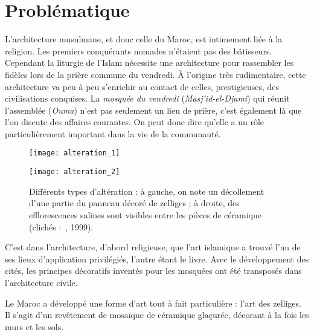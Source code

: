 
\chapter{Problématique}

L'architecture musulmane, et donc celle du Maroc, est intimement 
liée à la religion. Les premiers conquérants nomades n'étaient pas 
des bâtisseurs. Cependant la liturgie de l'Islam nécessite une 
architecture pour rassembler les fidèles lors de la prière commune du 
vendredi. À l'origine très rudimentaire, cette architecture va peu à 
peu s'enrichir au contact de celles, prestigieuses, des civilisations 
conquises. La \emph{mosquée du vendredi} (\emph{Masj'id-el-Djami}) 
qui réunit l'assemblée (\emph{Ouma}) n'est pas seulement un lieu de 
prière, c'est également là que l'on discute des affaires courantes. 
On peut donc dire qu'elle a un rôle particulièrement important dans 
la vie de la communauté.

\begin{figure}[htb]
  \begin{minipage}[t]{0.45\textwidth}
    \vspace{0pt}
    \texttt{[image: alteration\_1]}%
  \end{minipage}%
  \quad%
  \begin{minipage}[t]{0.45\textwidth}
    \vspace{0pt}
    \texttt{[image: alteration\_2]}%
    \caption{Différents types d'altération : à gauche, on note un 
             décollement d'une partie du panneau décoré de zelliges ; 
             à droite, des efflorescences salines sont visibles entre 
             les pièces de céramique (clichés :~, 1999).}
    \label{fig:alteration}
  \end{minipage}%
\end{figure}

C'est dans l'architecture, d'abord religieuse, que l'art islamique a 
trouvé l'un de ses lieux d'application privilégiés, l'autre étant le 
livre. Avec le développement des cités, les principes décoratifs 
inventés pour les mosquées ont été transposés dans l'architecture 
civile.

Le Maroc a développé une forme d'art tout à fait particulière : 
l'art des zelliges. Il s'agit d'un revêtement de mosaïque de 
céramique glaçurée, décorant à la fois les murs et les sols.


